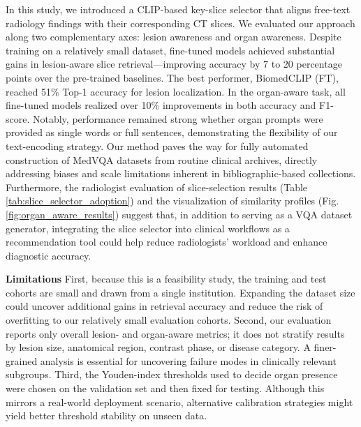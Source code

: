 \documentclass[bioengineering,article,submit,pdftex,moreauthors]{Definitions/mdpi}
\begin{document}
In this study, we introduced a CLIP-based key-slice selector that aligns free-text radiology findings with their corresponding CT slices. 
We evaluated our approach along two complementary axes: lesion awareness and organ awareness. 
Despite training on a relatively small dataset, fine-tuned models achieved substantial gains in lesion-aware slice retrieval—improving accuracy by 7 to 20 percentage points over the pre-trained baselines. 
The best performer, BiomedCLIP (FT), reached 51\% Top-1 accuracy for lesion localization. 
In the organ-aware task, all fine-tuned models realized over 10\% improvements in both accuracy and F1-score. 
Notably, performance remained strong whether organ prompts were provided as single words or full sentences, demonstrating the flexibility of our text-encoding strategy. 
Our method paves the way for fully automated construction of MedVQA datasets from routine clinical archives, directly addressing biases and scale limitations inherent in bibliographic-based collections. 
Furthermore, the radiologist evaluation of slice-selection results (Table \ref{tab:slice_selector_adoption}) and the visualization of similarity profiles (Fig. \ref{fig:organ_aware_results}) suggest that, in addition to serving as a VQA dataset generator, integrating the slice selector into clinical workflows as a recommendation tool could help reduce radiologists’ workload and enhance diagnostic accuracy. 


\textbf{Limitations}
First, because this is a feasibility study, the training and test cohorts are small and drawn from a single institution. Expanding the dataset size could uncover additional gains in retrieval accuracy and reduce the risk of overﬁtting to our relatively small evaluation cohorts. 
Second, our evaluation reports only overall lesion- and organ-aware metrics; it does not stratify results by lesion size, anatomical region, contrast phase, or disease category. A finer-grained analysis is essential for uncovering failure modes in clinically relevant subgroups. 
Third, the Youden-index thresholds used to decide organ presence were chosen on the validation set and then fixed for testing. Although this mirrors a real-world deployment scenario, alternative calibration strategies might yield better threshold stability on unseen data. 
\end{document}
